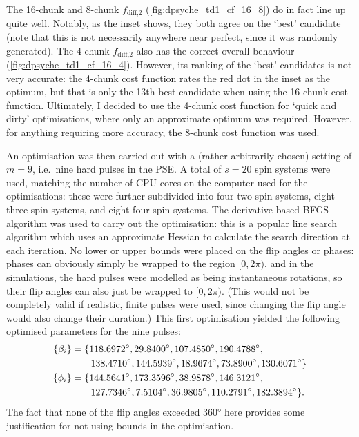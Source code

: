 The 16-chunk and 8-chunk $f_\text{diff,2}$ (\cref{fig:dpsyche_td1_cf_16_8}) do in fact line up quite well.
Notably, as the inset shows, they both agree on the `best' candidate (note that this is not necessarily anywhere near perfect, since it was randomly generated).
The 4-chunk $f_\text{diff,2}$ also has the correct overall behaviour (\cref{fig:dpsyche_td1_cf_16_4}).
However, its ranking of the `best' candidates is not very accurate: the 4-chunk cost function rates the red dot in the inset as the optimum, but that is only the 13th-best candidate when using the 16-chunk cost function.
Ultimately, I decided to use the 4-chunk cost function for `quick and dirty' optimisations, where only an approximate optimum was required.
However, for anything requiring more accuracy, the 8-chunk cost function was used.

An optimisation was then carried out with a (rather arbitrarily chosen) setting of $m = 9$, i.e.\ nine hard pulses in the PSE.
A total of $s = 20$ spin systems were used, matching the number of CPU cores on the computer used for the optimisations: these were further subdivided into four two-spin systems, eight three-spin systems, and eight four-spin systems.
The derivative-based BFGS algorithm was used to carry out the optimisation: this is a popular line search algorithm which uses an approximate Hessian to calculate the search direction at each iteration.\autocite{Kelley1999,Nocedal2006}
No lower or upper bounds were placed on the flip angles or phases: phases can obviously simply be wrapped to the region $[0, 2\pi)$, and in the simulations, the hard pulses were modelled as being instantaneous rotations, so their flip angles can also just be wrapped to $[0, 2\pi)$.
(This would not be completely valid if realistic, finite pulses were used, since changing the flip angle would also change their duration.)
This first optimisation yielded the following optimised parameters for the nine pulses:
\begin{align}
    \{\beta_i\} &= \{\ang{118.6972}, \ang{29.8400}, \ang{107.4850}, \ang{190.4788}, \notag \\
                &\qquad \ang{138.4710}, \ang{144.5939}, \ang{18.9674}, \ang{73.8900}, \ang{130.6071}\} \label{eq:dpsyche_opt_nosens_angles} \\
     \{\phi_i\} &= \{\ang{144.5641}, \ang{173.3596}, \ang{38.9878}, \ang{146.3121}, \notag \\
                &\qquad \ang{127.7346}, \ang{7.5104}, \ang{36.9805}, \ang{110.2791}, \ang{182.3894}\}. \label{eq:dpsyche_opt_nosens_phases}
\end{align}
The fact that none of the flip angles exceeded \ang{360} here provides some justification for not using bounds in the optimisation.

